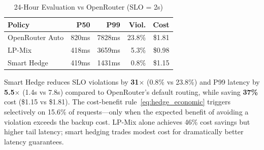 \begin{table}[ht]
\caption{24-Hour Evaluation vs OpenRouter (SLO = 2s)}
\label{tab:openrouter_comparison}
\vskip 0.1in
\begin{center}
\begin{small}
\begin{tabular}{@{}lrrrr@{}}
\toprule
Policy & P50 & P99 & Viol. & Cost \\
\midrule
OpenRouter Auto & 820ms & 7828ms & 23.8\% & \$1.81 \\
LP-Mix & 418ms & 3659ms & 5.3\% & \$0.98 \\
Smart Hedge & 419ms & 1431ms & 0.8\% & \$1.15 \\
\bottomrule
\end{tabular}
\end{small}
\end{center}
\vskip -0.1in
\end{table}

Smart Hedge reduces SLO violations by \textbf{31$\times$} (0.8\% vs 23.8\%) and P99 latency by \textbf{5.5$\times$} (1.4s vs 7.8s) compared to OpenRouter's default routing, while saving \textbf{37\%} cost (\$1.15 vs \$1.81). The cost-benefit rule~\eqref{eq:hedge_economic} triggers selectively on 15.6\% of requests---only when the expected benefit of avoiding a violation exceeds the backup cost. LP-Mix alone achieves 46\% cost savings but higher tail latency; smart hedging trades modest cost for dramatically better latency guarantees.
